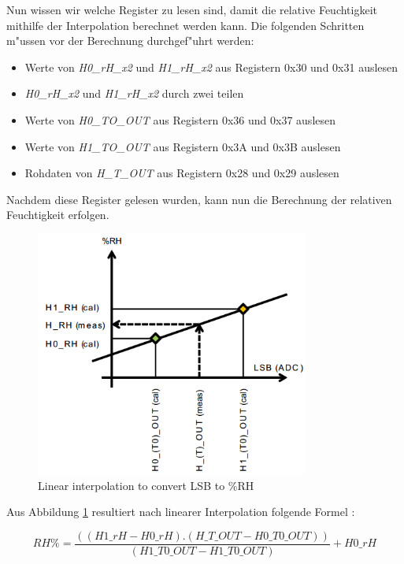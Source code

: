 Nun wissen wir welche Register zu lesen sind, damit die relative 
Feuchtigkeit mithilfe der Interpolation berechnet werden kann. Die folgenden 
Schritten m"ussen vor der Berechnung durchgef"uhrt werden:

\begin{itemize}
	\item Werte von \textit{H0\_rH\_x2} und \textit{H1\_rH\_x2} aus 
	Registern 0x30 und 0x31 auslesen 
	\item \textit{H0\_rH\_x2} und \textit{H1\_rH\_x2} durch zwei teilen
	\item Werte von \textit{H0\_TO\_OUT} aus Registern 0x36 und 0x37 
	auslesen 
	\item Werte von \textit{H1\_TO\_OUT} aus Registern 0x3A und 0x3B 
	auslesen
	\item Rohdaten von \textit{H\_T\_OUT} aus Registern 0x28 und 0x29 
	auslesen
\end{itemize}

Nachdem diese Register gelesen wurden, kann nun die Berechnung der 
relativen Feuchtigkeit erfolgen.

\begin{figure}[h]
	\centering
	\includegraphics[width=9cm]{source/images/rH}
	\caption{Linear interpolation to convert \ac{LSB} to \%\ac{RH}
	\cite{HTS221}}\label{fig:rH}
\end{figure}

Aus Abbildung \ref{fig:rH} resultiert nach linearer Interpolation folgende 
Formel \cite{HTS221}:

\begin{center}
	\[
	RH\% = \frac{((H1\_rH - H0\_rH) . (H\_T\_OUT - 
	H0\_T0\_OUT))}{(H1\_T0\_OUT - H1\_T0\_OUT) } + H0\_rH  
	\]\label{HumFormel}
\end{center}

